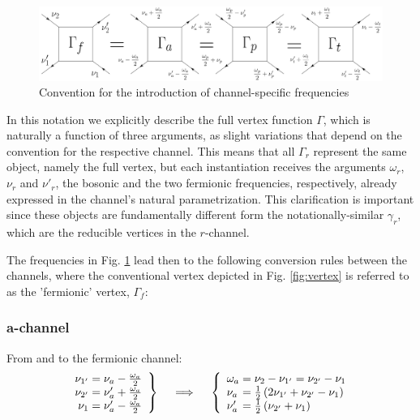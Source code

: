 \documentclass[12pt,a4paper,roman]{article}
\begin{document}
\begin{figure}[ht]
    \centering
    \includegraphics[width=\linewidth]{figures/channels_with_labels.png}
    \caption{Convention for the introduction of channel-specific frequencies}
    \label{fig:channels}
\end{figure}
In this notation we explicitly describe the full vertex function $\Gamma$, which is naturally a function of three arguments, as slight variations that depend on the convention for the respective channel. This means that all $\Gamma_r$ represent the same object, namely the full vertex, but each instantiation receives the arguments $\omega_r$, $\nu_r$ and $\nu'_r$, the bosonic and the two fermionic frequencies, respectively, already expressed in the channel's natural parametrization. This clarification is important since these objects are fundamentally different form the notationally-similar $\gamma_r$, which are the reducible vertices in the $r$-channel.

The frequencies in Fig. \ref{fig:channels} lead then to the following conversion rules between the channels, where the conventional vertex depicted in Fig. \ref{fig:vertex} is referred to as the 'fermionic' vertex, $\Gamma_f$:

\subsubsection*{a-channel}
From and to the fermionic channel:
\begin{align}
    \left.\begin{array}{r@{\mskip\thickmuskip}l}
    \nu_{1'} &= \nu_a - \frac{\omega_a}{2} \\
    \nu_{2'} &= \nu'_a + \frac{\omega_a}{2} \\
    \nu_{1 } &= \nu'_a - \frac{\omega_a}{2} \\
  \end{array} \right\}
  \quad \implies \quad
  \left\{\begin{array}{l@{\mskip\thickmuskip}l}
    \omega_a &= \nu_{2} - \nu_{1'} = \nu_{2'} - \nu_{1}\\
    \nu_a    &= \frac{1}{2}\left(2\nu_{1'}+\nu_{2'}-\nu_{1}\right) \\
    \nu'_a   &= \frac{1}{2}\left(\nu_{2'} + \nu_{1}\right)\\
  \end{array}\right.
\end{align}
\end{document}
